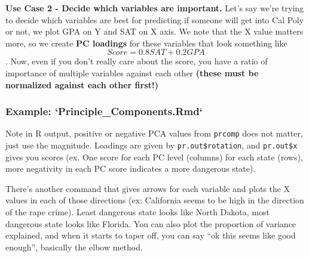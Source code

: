 \textbf{Use Case 2 - Decide which variables are important.} Let's say
we're trying to decide which variables are best for predicting if
someone will get into Cal Poly or not, we plot GPA on Y and SAT on X
axis. We note that the X value matters more, so we create \textbf{PC
loadings} for these variables that look something like
\[Score = 0.8SAT + 0.2GPA\]. Now, even if you don't really care about
the score, you have a ratio of importance of multiple variables against
each other \textbf{(these must be normalized against each other first!)}

\hypertarget{example-principle_components.rmd}{%
\subsubsection{Example:
`Principle\_Components.Rmd`}\label{example-principle_components.rmd}}

Note in R output, positive or negative PCA values from \texttt{prcomp}
does not matter, just use the magnitude. Loadings are given by
\texttt{pr.out\$rotation}, and \texttt{pr.out\$x} gives you scores (ex.
One score for each PC level (columns) for each state (rows), more
negativity in each PC score indicates a more dangerous state).

There's another command that gives arrows for each variable and plots
the X values in each of those directions (ex: California seems to be
high in the direction of the rape crime). Least dangerous state looks
like North Dakota, most dangerous state looks like Florida. You can also
plot the proportion of variance explained, and when it starts to taper
off, you can say ``ok this seems like good enough'', basically the elbow
method.
